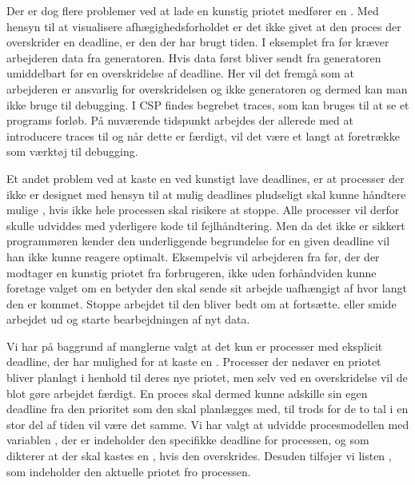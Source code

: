Der er dog flere problemer ved at lade en kunstig priotet medfører en .  Med hensyn til at visualisere afhægighedsforholdet er det ikke givet at den proces der overskrider en deadline, er den der har brugt tiden. 
I eksemplet fra før kræver arbejderen data fra generatoren. Hvis data først bliver sendt fra generatoren umiddelbart før en overskridelse af deadline. Her vil det fremgå som at arbejderen er ansvarlig for overskridelsen og ikke generatoren og dermed kan man ikke bruge  til debugging. I CSP findes begrebet traces, som kan bruges til at se et programs forløb. På nuværende tidspunkt arbejdes der allerede med at introducere traces til \pycsp og når dette er færdigt, vil det være et langt at foretrække som værktøj til debugging.

Et andet problem ved at kaste en  ved kunstigt lave deadlines, er at processer der ikke er designet med hensyn til at mulig deadlines pludseligt skal kunne håndtere mulige , hvis ikke hele processen skal risikere at stoppe. Alle processer vil derfor skulle udviddes med yderligere kode til fejlhåndtering. Men da det ikke er sikkert programmøren kender den underliggende begrundelse for en given deadline vil han ikke kunne reagere optimalt. Eksempelvis  vil arbejderen fra før, der der modtager en kunstig priotet fra forbrugeren, ikke uden  forhåndviden kunne foretage valget om en  betyder den skal sende sit arbejde uafhængigt af hvor langt den er kommet. Stoppe arbejdet til den bliver bedt om at fortsætte. eller smide arbejdet ud og starte bearbejdningen af nyt data.

Vi har på baggrund af manglerne valgt at det kun er processer med  eksplicit deadline, der har mulighed for at kaste en . Processer der nedaver en priotet bliver planlagt i henhold til deres nye priotet, men selv ved en overskridelse vil de blot gøre arbejdet færdigt. En proces skal dermed kunne adskille sin egen deadline fra den prioritet som den skal planlægges med, til trods for de to tal i en stor del af tiden vil være det samme.
Vi har valgt at udvidde procesmodellen med variablen , der er indeholder den specifikke deadline for processen, og som dikterer at der skal kastes en , hvis den overskrides. Desuden tilføjer vi listen , som indeholder den aktuelle priotet fro processen.

